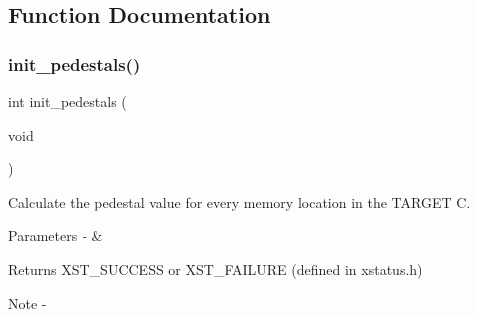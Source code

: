 \subsection{Function Documentation}
\mbox{\label{pedestal_8h_a929a976b9db373b2e82d86027463c49a}} 
\subsubsection{init\_pedestals()}
{\footnotesize\ttfamily int init\+\_\+pedestals (\begin{DoxyParamCaption}\item[{void}]{ }\end{DoxyParamCaption})}



Calculate the pedestal value for every memory location in the T\+A\+R\+G\+ET C. 


\begin{DoxyParams}{Parameters}
{\em -\/} & \\
\hline
\end{DoxyParams}
\begin{DoxyReturn}{Returns}
X\+S\+T\+\_\+\+S\+U\+C\+C\+E\+SS or X\+S\+T\+\_\+\+F\+A\+I\+L\+U\+RE (defined in xstatus.\+h)
\end{DoxyReturn}
\begin{DoxyNote}{Note}
-\/ 
\end{DoxyNote}
